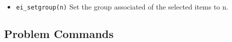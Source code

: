 \begin{itemize}
Meshed with elements that span at most \texttt{maxsegdeg} degrees
per element

Boundary property \texttt{'propname'}

\texttt{hide}: 0 = not hidden in post-processor, 1 == hidden in post
processor

A member of group number \texttt{group}

A member of the conductor specified by the string
\texttt{'inconductor'.} If the segment is not part of a conductor,
this parameter can be specified as
\texttt{'<None>'}.

\item{\tt ei\_setgroup(n)} Set the group associated of the selected items to n.

\end{itemize}

\subsection{Problem Commands}

